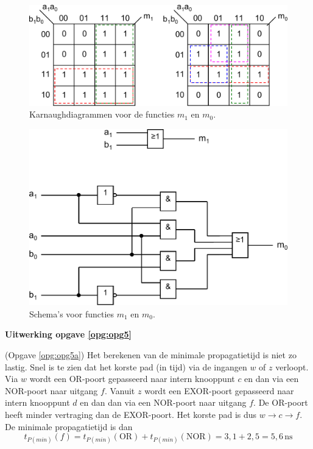 \documentclass[a4paper,12pt,addpoints,fleqn,dutch,concept]{tisdexam}
\begin{document}
\begin{questions}
\begin{figure}[H]
\begin{minipage}[c]{0.65\linewidth}
    \centering
	\includegraphics[scale=0.50]{pINLDIG2014_opgave4b_kmaps.pdf}
    \caption{Karnaughdiagrammen voor de functies $m_{1}$ en $m_{0}$.}
    \label{fig:ant_opgave4b_kmaps}
  \end{minipage}
\end{figure}

\begin{figure}[H]
  \centering
  \includegraphics[scale=0.63]{pINLDIG2014_opgave4c_schema.pdf}
  \caption{Schema's voor functies $m_{1}$ en $m_{0}$.}
  \label{fig:ant_opgave4c_schema}
\end{figure}


\newpage
\textbf{Uitwerking opgave \ref{opg:opg5}}

(Opgave \ref{opg:opg5a}) Het berekenen van de minimale propagatietijd is niet zo lastig.
Snel is te zien dat het korste pad (in tijd) via de ingangen $w$ of $z$ verloopt. Via $w$
wordt een OR-poort gepasseerd naar intern knooppunt $c$ en dan via een NOR-poort naar
uitgang $f$. Vanuit $z$ wordt een EXOR-poort gepasseerd naar intern knooppunt $d$ en
dan dan via een NOR-poort naar uitgang $f$. De OR-poort heeft minder vertraging dan de
EXOR-poort. Het korste pad is dus $w \rightarrow c \rightarrow f$. De minimale
propagatietijd is dan
\begin{equation*}
t_{P(min)}(f) = t_{P(min)}(\text{OR}) + t_{P(min)}(\text{NOR}) = 3,1 + 2,5 = 5,6 \, \textrm{ns}
\end{equation*}


\end{questions}
\end{document}
